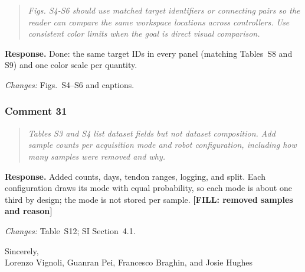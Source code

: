 \documentclass[11pt,a4paper]{article}
\newcommand{\rc}[1]{\begin{quote}\color{black!70}\itshape #1\end{quote}}
\begin{document}
\rc{Figs. S4-S6 should use matched target identifiers or connecting pairs so the reader can compare the same workspace locations across controllers. Use consistent color limits when the goal is direct visual comparison.}
\textbf{Response.} Done: the same target IDs in every panel (matching Tables~S8 and S9) and one color scale per quantity.

\textit{Changes:} Figs.~S4--S6 and captions.

\subsubsection*{Comment 31}

\rc{Tables S3 and S4 list dataset fields but not dataset composition. Add sample counts per acquisition mode and robot configuration, including how many samples were removed and why.}
\textbf{Response.} Added counts, days, tendon ranges, logging, and split. Each configuration draws its mode with equal probability, so each mode is about one third by design; the mode is not stored per sample. \textbf{[FILL: removed samples and reason]}

\textit{Changes:} Table~S12; SI Section~4.1.

\bigskip
Sincerely,\\
Lorenzo Vignoli, Guanran Pei, Francesco Braghin, and Josie Hughes
\end{document}
